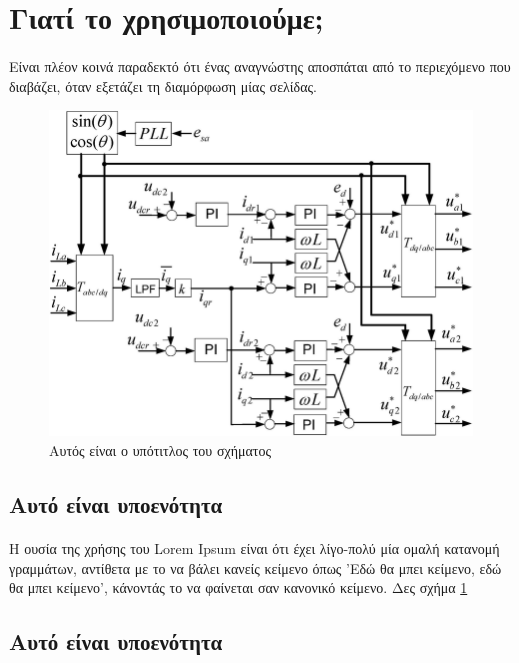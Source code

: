 
\section{Γιατί το χρησιμοποιούμε;}
    \paragraph{}
    Είναι πλέον κοινά παραδεκτό ότι ένας αναγνώστης αποσπάται από το περιεχόμενο που διαβάζει, όταν εξετάζει τη διαμόρφωση
    μίας σελίδας.

    \begin{figure}[h!]
        \centering
        \includegraphics[scale=0.3]{assets/figures/figure_1.png}
        \caption{Αυτός είναι ο υπότιτλος του σχήματος}
        \label{fig:figure of something}
    \end{figure}
    
    \subsection{Αυτό είναι υποενότητα}
    \paragraph{}
    Η ουσία της χρήσης του Lorem Ipsum είναι ότι έχει λίγο-πολύ μία ομαλή κατανομή γραμμάτων, αντίθετα με το
    να βάλει κανείς κείμενο όπως 'Εδώ θα μπει κείμενο, εδώ θα μπει κείμενο', κάνοντάς το να φαίνεται σαν κανονικό κείμενο.
    Δες σχήμα \ref{fig:figure of something}

    \subsection{Αυτό είναι υποενότητα}
